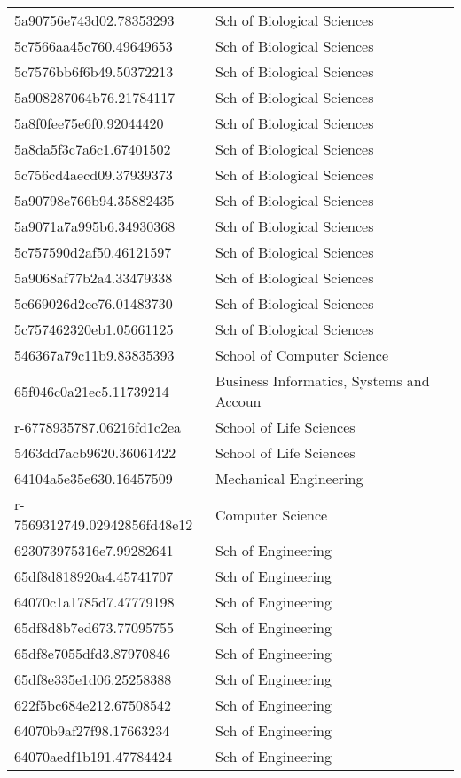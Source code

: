 \begin{tabular}{ll}
5a90756e743d02.78353293 & Sch of Biological Sciences \\
5c7566aa45c760.49649653 & Sch of Biological Sciences \\
5c7576bb6f6b49.50372213 & Sch of Biological Sciences \\
5a908287064b76.21784117 & Sch of Biological Sciences \\
5a8f0fee75e6f0.92044420 & Sch of Biological Sciences \\
5a8da5f3c7a6c1.67401502 & Sch of Biological Sciences \\
5c756cd4aecd09.37939373 & Sch of Biological Sciences \\
5a90798e766b94.35882435 & Sch of Biological Sciences \\
5a9071a7a995b6.34930368 & Sch of Biological Sciences \\
5c757590d2af50.46121597 & Sch of Biological Sciences \\
5a9068af77b2a4.33479338 & Sch of Biological Sciences \\
5e669026d2ee76.01483730 & Sch of Biological Sciences \\
5c757462320eb1.05661125 & Sch of Biological Sciences \\
546367a79c11b9.83835393 & School of Computer Science \\
65f046c0a21ec5.11739214 & Business Informatics, Systems and Accoun \\
r-6778935787.06216fd1c2ea & School of Life Sciences \\
5463dd7acb9620.36061422 & School of Life Sciences \\
64104a5e35e630.16457509 & Mechanical Engineering \\
r-7569312749.02942856fd48e12 & Computer Science \\
623073975316e7.99282641 & Sch of Engineering \\
65df8d818920a4.45741707 & Sch of Engineering \\
64070c1a1785d7.47779198 & Sch of Engineering \\
65df8d8b7ed673.77095755 & Sch of Engineering \\
65df8e7055dfd3.87970846 & Sch of Engineering \\
65df8e335e1d06.25258388 & Sch of Engineering \\
622f5bc684e212.67508542 & Sch of Engineering \\
64070b9af27f98.17663234 & Sch of Engineering \\
64070aedf1b191.47784424 & Sch of Engineering \\

\end{tabular}
